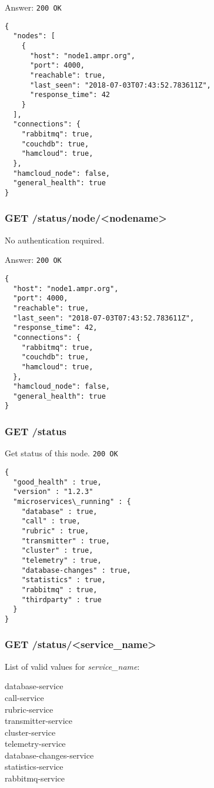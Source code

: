 Answer:
\texttt{200 OK}
\begin{lstlisting}
{
  "nodes": [
    {
      "host": "node1.ampr.org",
      "port": 4000,
      "reachable": true,
      "last_seen": "2018-07-03T07:43:52.783611Z",
      "response_time": 42
    }
  ],
  "connections": {
    "rabbitmq": true,
    "couchdb": true,
    "hamcloud": true,
  },
  "hamcloud_node": false,
  "general_health": true
}
\end{lstlisting}

\subsubsection{GET /status/node/<nodename>}
No authentication required.

Answer:
\texttt{200 OK}
\begin{lstlisting}
{
  "host": "node1.ampr.org",
  "port": 4000,
  "reachable": true,
  "last_seen": "2018-07-03T07:43:52.783611Z",
  "response_time": 42,
  "connections": {
    "rabbitmq": true,
    "couchdb": true,
    "hamcloud": true,
  },
  "hamcloud_node": false,
  "general_health": true
}
\end{lstlisting}


\subsubsection{GET /status}
Get status of this node.
\texttt{200 OK}
\begin{lstlisting}
{
  "good_health" : true,
  "version" : "1.2.3"
  "microservices\_running" : {
    "database" : true,
    "call" : true,
    "rubric" : true,
    "transmitter" : true,
    "cluster" : true,
    "telemetry" : true,
    "database-changes" : true,
    "statistics" : true,
    "rabbitmq" : true,
    "thirdparty" : true
  }
}
\end{lstlisting}

\subsubsection{GET /status/<service\_name>}
List of valid values for \textit{service\_name}:

database-service\\
call-service\\
rubric-service\\
transmitter-service\\
cluster-service\\
telemetry-service\\
database-changes-service\\
statistics-service\\
rabbitmq-service\\


